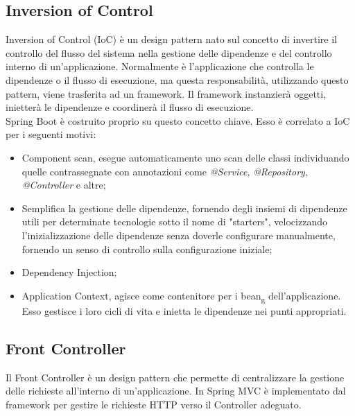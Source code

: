 \subsection*{Inversion of Control}
Inversion of Control (IoC) è un design pattern nato sul concetto di invertire il controllo del flusso del sistema nella gestione delle dipendenze e del controllo interno di un'applicazione. Normalmente è l'applicazione che controlla le dipendenze o il flusso di esecuzione, ma questa responsabilità, utilizzando questo pattern, viene trasferita ad un framework. Il framework instanzierà oggetti, inietterà le dipendenze e coordinerà il flusso di esecuzione.\\
Spring Boot è costruito proprio su questo concetto chiave. Esso è correlato a IoC per i seguenti motivi:
\begin{itemize}
\item Component scan, esegue automaticamente uno scan delle classi individuando quelle contrassegnate con annotazioni come \textit{@Service}, \textit{@Repository}, \textit{@Controller} e altre;
\item Semplifica la gestione delle dipendenze, fornendo degli insiemi di dipendenze utili per determinate tecnologie sotto il nome di "starters", velocizzando l'inizializzazione delle dipendenze senza doverle configurare manualmente, fornendo un senso di controllo sulla configurazione iniziale;
\item Dependency Injection;
\item Application Context, agisce come contenitore per i bean\textsubscript{g} dell'applicazione. Esso gestisce i loro cicli di vita e inietta le dipendenze nei punti appropriati.
\end{itemize}
\subsection*{Front Controller}
Il Front Controller è un design pattern che permette di centralizzare la gestione delle richieste all'interno di un'applicazione. In Spring MVC è implementato dal framework per gestire le richieste HTTP verso il Controller adeguato.
